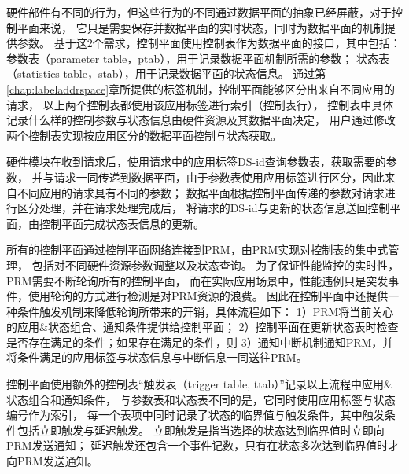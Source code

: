 硬件部件有不同的行为，但这些行为的不同通过数据平面的抽象已经屏蔽，对于控制平面来说，
它只是需要保存并数据平面的实时状态，同时为数据平面的机制提供参数。
基于这2个需求，控制平面使用控制表作为数据平面的接口，其中包括：
参数表（parameter table，ptab），用于记录数据平面机制所需的参数；
状态表（statistics table，stab），用于记录数据平面的状态信息。
通过第\ref{chap:labeladdrspace}章所提供的标签机制，控制平面能够区分出来自不同应用的请求，
以上两个控制表都使用该应用标签进行索引（控制表行），
控制表中具体记录什么样的控制参数与状态信息由硬件资源及其数据平面决定，
用户通过修改两个控制表实现按应用区分的数据平面控制与状态获取。

硬件模块在收到请求后，使用请求中的应用标签DS-id查询参数表，获取需要的参数，
并与请求一同传递到数据平面，由于参数表使用应用标签进行区分，因此来自不同应用的请求具有不同的参数；
数据平面根据控制平面传递的参数对请求进行区分处理，并在请求处理完成后，
将请求的DS-id与更新的状态信息送回控制平面，由控制平面完成状态表信息的更新。

所有的控制平面通过控制平面网络连接到PRM，由PRM实现对控制表的集中式管理，
包括对不同硬件资源参数调整以及状态查询。
为了保证性能监控的实时性，PRM需要不断轮询所有的控制平面，
而在实际应用场景中，性能违例只是突发事件，使用轮询的方式进行检测是对PRM资源的浪费。
因此在控制平面中还提供一种条件触发机制来降低轮询所带来的开销，具体流程如下：
1）PRM将当前关心的应用\&状态组合、通知条件提供给控制平面；
2）控制平面在更新状态表时检查是否存在满足的条件；如果存在满足的条件，则
3）通知中断机制通知PRM，并将条件满足的应用标签与状态信息与中断信息一同送往PRM。

控制平面使用额外的控制表``触发表（trigger table, ttab）''记录以上流程中应用\&状态组合和通知条件，
与参数表和状态表不同的是，它同时使用应用标签与状态编号作为索引，
每一个表项中同时记录了状态的临界值与触发条件，其中触发条件包括立即触发与延迟触发。
立即触发是指当选择的状态达到临界值时立即向PRM发送通知；
延迟触发还包含一个事件记数，只有在状态多次达到临界值时才向PRM发送通知。

